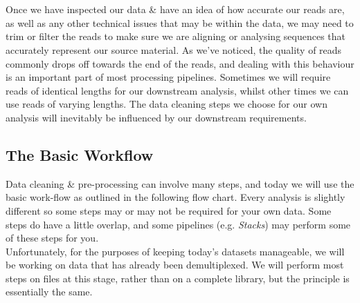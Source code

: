 
\chapter{\moduleTitle}
\newpage


Once we have inspected our data \& have an idea of how accurate our reads are, as well as any other technical issues that may be within the data, we may need to trim or filter the reads to make sure we are aligning or analysing sequences that accurately represent our source material.
As we've noticed, the quality of reads commonly drops off towards the end of the reads, and dealing with this behaviour is an important part of most processing pipelines.
Sometimes we will require reads of identical lengths for our downstream analysis, whilst other times we can use reads of varying lengths.
The data cleaning steps we choose for our own analysis will inevitably be influenced by our downstream requirements.

\section{The Basic Workflow}

Data cleaning \& pre-processing can involve many steps, and today we will use the basic work-flow as outlined in the following flow chart.
Every analysis is slightly different so some steps may or may not be required for your own data.
Some steps do have a little overlap, and some pipelines (e.g. \textit{Stacks}) may perform some of these steps for you.\\

Unfortunately, for the purposes of keeping today's datasets manageable, we will be working on data that has already been demultiplexed.
We will perform most steps on files at this stage, rather than on a complete library, but the principle is essentially the same.\\

